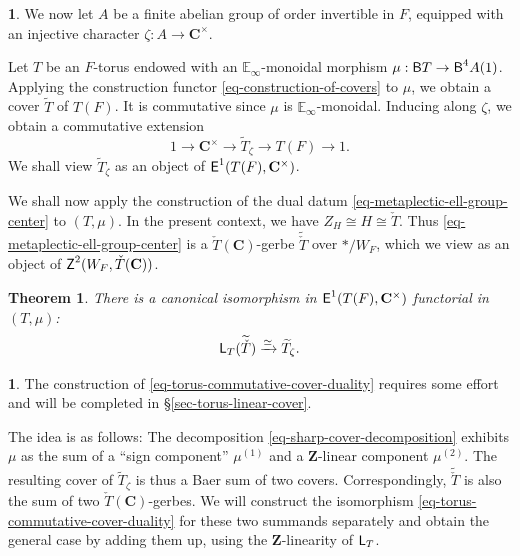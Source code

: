 \documentclass[10pt,english,reqno]{amsart}
\newcommand{\integers}{\mathbf Z}
\newcommand{\complexes}{\mathbf C}
\newcommand{\cycle}{\textnormal{\textsf{Z}}}
\newcommand{\extension}{\textnormal{\textsf{E}}}
\newcommand{\deloop}{\textnormal{\textsf{B}}}
\newcommand{\Langlands}{\textnormal{\textsf{L}}}
\newtheorem{thm}[subsubsection]{Theorem}
\theoremstyle{definition}
\numberwithin{equation}{section}
\newtheorem{untitledsubsubsection}[subsubsection]{}
\newenvironment{void}
{\begin{untitledsubsubsection}}
{\end{untitledsubsubsection}}
\begin{document}

\begin{void}
\label{void-torus-commutative-cover}
We now let $A$ be a finite abelian group of order invertible in $F$, equipped with an injective character $\zeta : A \rightarrow \complexes^{\times}$.

Let $T$ be an $F$-torus endowed with an $\mathbb E_{\infty}$-monoidal morphism $\mu : \deloop T \rightarrow \deloop^4A(1)$. Applying the construction functor \eqref{eq-construction-of-covers} to $\mu$, we obtain a cover $\widetilde T$ of $T(F)$. It is commutative since $\mu$ is $\mathbb E_{\infty}$-monoidal. Inducing along $\zeta$, we obtain a commutative extension
\begin{equation}
\label{eq-torus-commutative-cover}
1 \rightarrow \complexes^{\times} \rightarrow \widetilde T_{\zeta} \rightarrow T(F) \rightarrow 1.
\end{equation}
We shall view $\widetilde T_{\zeta}$ as an object of $\extension^1(T(F), \complexes^{\times})$.

We shall now apply the construction of the dual datum \eqref{eq-metaplectic-ell-group-center} to $(T, \mu)$. In the present context, we have $Z_H \cong H \cong \check T$. Thus \eqref{eq-metaplectic-ell-group-center} is a $\check T(\complexes)$-gerbe $\widetilde{\check T}$ over $*/W_F$, which we view as an object of $\cycle^2(W_F, \check T(\complexes))$.
\end{void}


\begin{thm}
\label{thm-torus-commutative-cover-duality}
There is a canonical isomorphism in $\extension^1(T(F), \complexes^{\times})$ functorial in $(T, \mu)$:
\begin{equation}
\label{eq-torus-commutative-cover-duality}
	\Langlands_T(\widetilde{\check T}) \xrightarrow{\simeq} \widetilde T_{\zeta}.
\end{equation}
\end{thm}


\begin{void}
The construction of \eqref{eq-torus-commutative-cover-duality} requires some effort and will be completed in \S\ref{sec-torus-linear-cover}.

The idea is as follows: The decomposition \eqref{eq-sharp-cover-decomposition} exhibits $\mu$ as the sum of a ``sign component'' $\mu^{(1)}$ and a $\integers$-linear component $\mu^{(2)}$. The resulting cover of $\widetilde T_{\zeta}$ is thus a Baer sum of two covers. Correspondingly, $\widetilde{\check T}$ is also the sum of two $\check T(\complexes)$-gerbes. We will construct the isomorphism \eqref{eq-torus-commutative-cover-duality} for these two summands separately and obtain the general case by adding them up, using the $\integers$-linearity of $\Langlands_T$.
\end{void}
\end{document}
